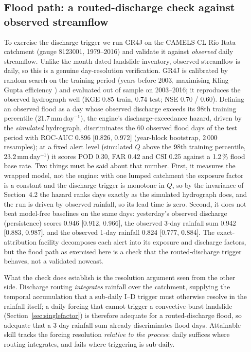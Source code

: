 \documentclass[authoryear,preprint,review,12pt]{elsarticle}
\begin{document}
\subsection{Flood path: a routed-discharge check against observed streamflow}

To exercise the discharge trigger we run GR4J \citep{perrin2003} on the CAMELS-CL
R\'io Itata catchment (gauge 8123001, 1979--2016) and validate it against
\emph{observed} daily streamflow. Unlike the month-dated landslide inventory,
observed streamflow is daily, so this is a genuine day-resolution verification.
GR4J is calibrated by random search on the training period (years before 2003,
maximising Kling--Gupta efficiency \citep{gupta2009}) and evaluated out of sample on 2003--2016; it
reproduces the observed hydrograph well (KGE 0.85 train, 0.74 test; NSE 0.70 / 0.60).
Defining an observed flood as a day whose observed discharge exceeds its 98th
training percentile (21.7\,mm\,day$^{-1}$), the engine's discharge-exceedance hazard,
driven by the \emph{simulated} hydrograph, discriminates the 60 observed flood days of the test period
with ROC-AUC 0.896 [0.826, 0.972] (year-block bootstrap, 2\,000 resamples); at a fixed alert level (simulated $Q$ above the
98th training percentile, 23.2\,mm\,day$^{-1}$) it scores POD 0.30, FAR 0.42 and
CSI 0.25 against a 1.2\,\% flood base rate. Two things must be said about that
number. First, it measures the wrapped model, not the engine: with one lumped
catchment the exposure factor is a constant and the discharge trigger is monotone
in $Q$, so by the invariance of Section~4.2 the hazard ranks days exactly as the
simulated hydrograph does, and the run is driven by observed rainfall, so its lead
time is zero. Second, it does not beat model-free baselines on the same days:
yesterday's observed discharge (persistence) scores 0.946 [0.912, 0.966], the
observed 3-day rainfall sum 0.942 [0.883, 0.987], and the observed 1-day rainfall
0.824 [0.777, 0.884]. The exact-attribution facility
decomposes each alert into its exposure and discharge factors, but the flood path as
exercised here is a check that the routed-discharge trigger behaves, not a validated
nowcast.

What the check does establish is the resolution argument seen from the other side. Discharge routing
\emph{integrates} rainfall over the catchment, supplying the temporal accumulation
that a sub-daily I--D trigger must otherwise resolve in the rainfall itself; a daily
forcing that cannot trigger a convective-burst landslide
(Section~\ref{sec:singlefactor}) is therefore adequate for a routed-discharge flood, so adequate that a 3-day rainfall sum already discriminates flood days. Attainable skill
tracks the forcing resolution \emph{relative to the process}: daily suffices where
routing integrates, and fails where triggering is sub-daily.
\end{document}
